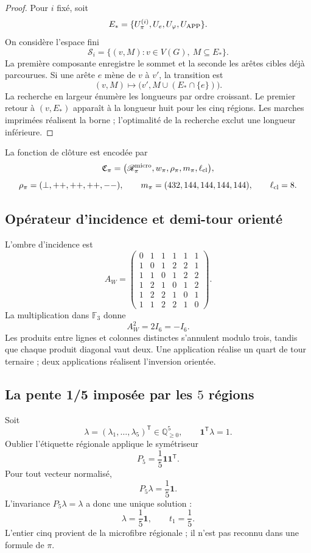 \begin{proof}
Pour \(i\) fixé, soit
\[
 E_*=\{U_\pi^{(i)},U_e,U_\varphi,U_{\rm APP}\}.
\]
On considère l’espace fini
\[
 \mathscr S_i=\{(v,M):v\in V(G),\ M\subseteq E_*\}.
\]
La première composante enregistre le sommet et la seconde les arêtes cibles
déjà parcourues. Si une arête \(e\) mène de \(v\) à \(v'\), la transition est
\[
 (v,M)\longmapsto
 \bigl(v',M\cup(E_*\cap\{e\})\bigr).
\]
La recherche en largeur énumère les longueurs par ordre croissant. Le premier
retour à \((v,E_*)\) apparaît à la longueur huit pour les cinq régions.
Les marches imprimées réalisent la borne ; l’optimalité de la recherche exclut
une longueur inférieure.
\end{proof}

La fonction de clôture est encodée par
\[
 \mathfrak C_\pi=
 \bigl(\mathscr R_\pi^{\rm micro},
 w_\pi,\rho_\pi,m_\pi,\ell_{\rm cl}\bigr),
\]
\[
 \rho_\pi=(\perp,++ ,++ ,++ ,--),
 \qquad
 m_\pi=(432,144,144,144,144),
 \qquad
 \ell_{\rm cl}=8.
\]

\subsection{Opérateur d’incidence et demi-tour orienté}

L’ombre d’incidence est
\[
 A_W=
 \begin{pmatrix}
 0&1&1&1&1&1\\
 1&0&1&2&2&1\\
 1&1&0&1&2&2\\
 1&2&1&0&1&2\\
 1&2&2&1&0&1\\
 1&1&2&2&1&0
 \end{pmatrix}.
\]
La multiplication dans \(\mathbb F_3\) donne
\begin{equation}
 \boxed{A_W^2=2I_6=-I_6.}
 \label{p12-83-c8-s1:eq:aw-cuadrado-menos-identidad-pi}
\end{equation}
Les produits entre lignes et colonnes distinctes s’annulent modulo trois,
tandis que chaque produit diagonal vaut deux. Une application réalise un quart
de tour ternaire ; deux applications réalisent l’inversion orientée.

\subsection{La pente 1/5 imposée par les \(5\) régions}

Soit
\[
 \lambda=(\lambda_1,\ldots,\lambda_5)^{\mathsf T}
 \in\mathbb Q_{\geq0}^5,
 \qquad
 \mathbf1^{\mathsf T}\lambda=1.
\]
Oublier l’étiquette régionale applique le symétriseur
\[
 P_5=\frac15\mathbf1\mathbf1^{\mathsf T}.
\]
Pour tout vecteur normalisé,
\[
 P_5\lambda=\frac15\mathbf1.
\]
L’invariance \(P_5\lambda=\lambda\) a donc une unique solution :
\begin{equation}
 \boxed{\lambda=\frac15\mathbf1,\qquad t_1=\frac15.}
 \label{p12-83-c8-s1:eq:pendiente-primitiva-pi}
\end{equation}
L’entier cinq provient de la microfibre régionale ; il n’est pas reconnu dans une
formule de \(\pi\).

